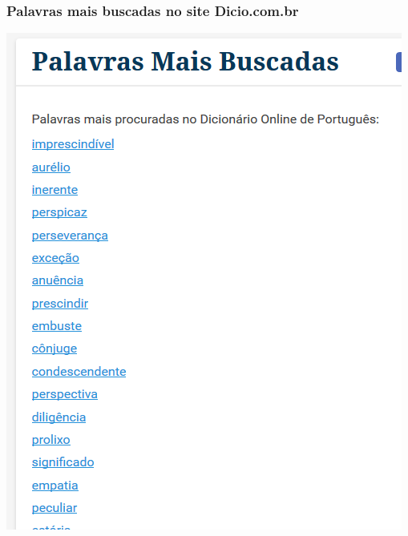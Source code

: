 \documentclass{beamer}
\begin{document}
\begin{frame}
\frametitle{Palavras mais buscadas no site Dicio.com.br}
\includegraphics[width=\textwidth]{Dicio_com_br.png}

\end{frame}
\end{document}
